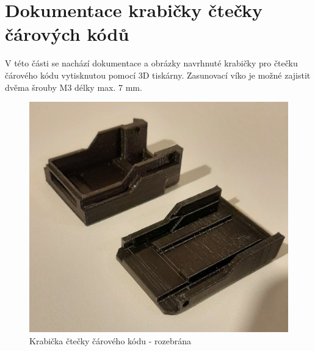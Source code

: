 
\chapter{Dokumentace krabičky čtečky čárových kódů}

V této části se nachází dokumentace a obrázky navrhnuté krabičky pro čtečku čárového kódu vytisknutou pomocí 3D tiskárny. Zasunovací víko je možné zajistit dvěma šrouby M3 délky max. 7 mm.

\begin{figure}[H]
    \begin{center}
        \includegraphics[scale=0.15]{obrazky/krabicka rozlozena.jpg}
    \end{center}
    \caption{Krabička čtečky čárového kódu - rozebrána}
    \label{Interakce mezi okny GUI}
\end{figure}

